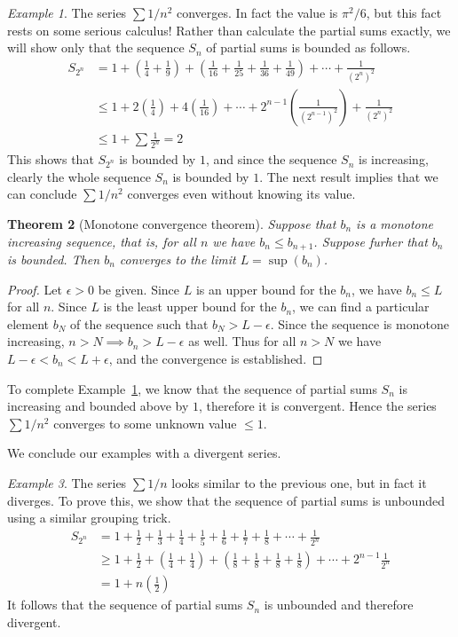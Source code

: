 \documentclass[11pt,oneside]{amsbook}
\theoremstyle{definition}
\theoremstyle{plain}
\newtheorem{thm}{Theorem}[section]
\theoremstyle{definition}
\theoremstyle{remark}
\newtheorem{example}[thm]{Example}
\numberwithin{equation}{section}
\numberwithin{figure}{section}
\begin{document}
\begin{example}
  \label{ex:1/n^2}
  The series $\sum1/n^2$ converges. In fact the value is $\pi^2/6$, but this fact rests on some serious calculus! Rather than calculate the partial sums exactly, we will show only that the sequence $S_n$ of partial sums is bounded as follows. 
  \begin{align*}
    S_{2^n}&=1+\left(\frac14+\frac19\right)
             +\left(\frac1{16}+\frac1{25}+\frac1{36}+\frac1{49}\right)
             +\cdots
             +\frac1{(2^n)^2}\\
           &\leq1+2\left(\frac14\right)+4\left(\frac1{16}\right)
             +\cdots+2^{n-1}\left(\frac1{(2^{n-1})^2}\right)+\frac1{(2^n)^2}\\
           &\leq1+\sum\frac1{2^n}=2
  \end{align*}
  This shows that $S_{2^n}$ is bounded by $1$, and since the sequence $S_n$ is increasing, clearly the whole sequence $S_n$ is bounded by $1$. The next result implies that we can conclude $\sum1/n^2$ converges even without knowing its value.
\end{example}

\begin{thm}[Monotone convergence theorem]
  Suppose that $b_n$ is a monotone increasing sequence, that is, for all $n$ we have $b_n\leq b_{n+1}$. Suppose furher that $b_n$ is bounded. Then $b_n$ converges to the limit $L=\sup(b_n)$.
\end{thm}

\begin{proof}
  Let $\epsilon>0$ be given. Since $L$ is an upper bound for the $b_n$, we have $b_n\leq L$ for all $n$. Since $L$ is the least upper bound for the $b_n$, we can find a particular element $b_N$ of the sequence such that $b_N>L-\epsilon$. Since the sequence is monotone increasing, $n>N\implies b_n>L-\epsilon$ as well. Thus for all $n>N$ we have $L-\epsilon<b_n<L+\epsilon$, and the convergence is established.
\end{proof}

To complete Example~\ref{ex:1/n^2}, we know that the sequence of partial sums $S_n$ is increasing and bounded above by $1$, therefore it is convergent. Hence the series $\sum1/n^2$ converges to some unknown value $\leq1$.

We conclude our examples with a divergent series.

\begin{example}
  The series $\sum 1/n$ looks similar to the previous one, but in fact it diverges. To prove this, we show that the sequence of partial sums is unbounded using a similar grouping trick.
\begin{align*}
  S_{2^n} &= 1+\frac12+\frac13+\frac14+\frac15+\frac16+\frac17+\frac18+
            \cdots+\frac1{2^n}\\
          &\geq 1+\frac12+\left(\frac14+\frac14\right)
            +\left(\frac18+\frac18+\frac18+\frac18\right)
            +\cdots+2^{n-1}\frac1{2^n}\\
          &=1+n\left(\frac12\right)
\end{align*}
It follows that the sequence of partial sums $S_n$ is unbounded and therefore divergent.
\end{example}
\end{document}
